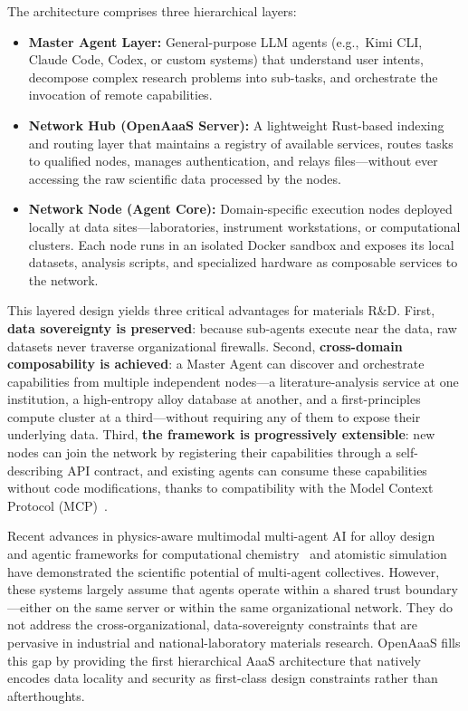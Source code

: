 \documentclass{article}
\begin{document}
The architecture comprises three hierarchical layers:
\begin{itemize}
\item \textbf{Master Agent Layer:} General-purpose LLM agents (e.g.,\ Kimi CLI, Claude Code, Codex, or custom systems) that understand user intents, decompose complex research problems into sub-tasks, and orchestrate the invocation of remote capabilities.
\item \textbf{Network Hub (OpenAaaS Server):} A lightweight Rust-based indexing and routing layer that maintains a registry of available services, routes tasks to qualified nodes, manages authentication, and relays files---without ever accessing the raw scientific data processed by the nodes.
\item \textbf{Network Node (Agent Core):} Domain-specific execution nodes deployed locally at data sites---laboratories, instrument workstations, or computational clusters. Each node runs in an isolated Docker sandbox and exposes its local datasets, analysis scripts, and specialized hardware as composable services to the network.
\end{itemize}

This layered design yields three critical advantages for materials R\&D. First, \textbf{data sovereignty is preserved}: because sub-agents execute near the data, raw datasets never traverse organizational firewalls. Second, \textbf{cross-domain composability is achieved}: a Master Agent can discover and orchestrate capabilities from multiple independent nodes---a literature-analysis service at one institution, a high-entropy alloy database at another, and a first-principles compute cluster at a third---without requiring any of them to expose their underlying data. Third, \textbf{the framework is progressively extensible}: new nodes can join the network by registering their capabilities through a self-describing API contract, and existing agents can consume these capabilities without code modifications, thanks to compatibility with the Model Context Protocol (MCP)~\cite{anthropic2024mcp}.

Recent advances in physics-aware multimodal multi-agent AI for alloy design~\cite{ghafarollahi2025pnas} and agentic frameworks for computational chemistry~\cite{pham2025chemgraph} and atomistic simulation~\cite{vriza2026} have demonstrated the scientific potential of multi-agent collectives. However, these systems largely assume that agents operate within a shared trust boundary---either on the same server or within the same organizational network. They do not address the cross-organizational, data-sovereignty constraints that are pervasive in industrial and national-laboratory materials research. OpenAaaS fills this gap by providing the first hierarchical AaaS architecture that natively encodes data locality and security as first-class design constraints rather than afterthoughts.
\end{document}
